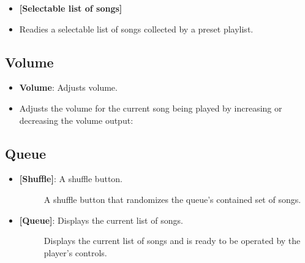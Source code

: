 \documentclass{article}
\begin{document}
\begin{itemize}
    \item \textbf{[Selectable list of songs]}
        \item[] Readies a selectable list of songs collected by a preset playlist.
\end{itemize}

\subsection{Volume}

\begin{itemize}
    \item \textbf{Volume}: Adjusts volume.
        \item[] Adjusts the volume for the current song being played by increasing or decreasing the volume output:  
\end{itemize}

\subsection{Queue}

\begin{itemize}
    \item \textbf{[Shuffle]}: A shuffle button.
    \begin{description}
        \item[] A shuffle button that randomizes the queue's contained set of songs.
    \end{description}
    \item \textbf{[Queue]}: Displays the current list of songs.
        \begin{description}
        \item[] Displays the current list of songs and is ready to be operated by the player's controls.
        \end{description}
\end{itemize}
\end{document}
